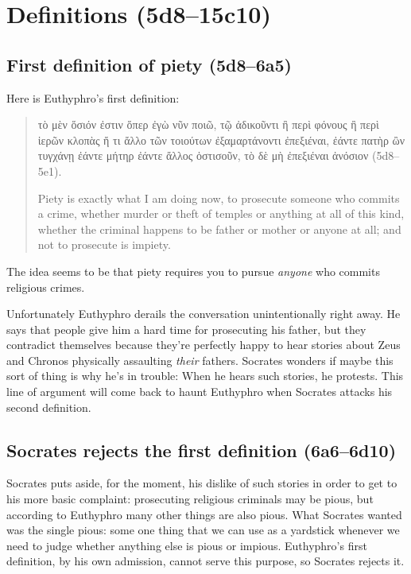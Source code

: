 \documentclass[11pt]{article}
\begin{document}

\section{Definitions (5d8--15c10)}

\subsection{First definition of piety (5d8--6a5)}

Here is Euthyphro's first definition:

\begin{quote}

    {\g
    τὸ μὲν ὅσιόν ἐστιν ὅπερ ἐγὼ νῦν ποιῶ, τῷ ἀδικοῦντι ἢ περὶ φόνους ἢ περὶ
    ἱερῶν κλοπὰς ἤ τι ἄλλο τῶν τοιούτων ἐξαμαρτάνοντι ἐπεξιέναι, ἐάντε
    πατὴρ ὢν τυγχάνῃ ἐάντε μήτηρ ἐάντε ἄλλος ὁστισοῦν, τὸ δὲ μὴ ἐπεξιέναι
    ἀνόσιον
    } (5d8--5e1).

    Piety is exactly what I am doing now, to prosecute someone who commits
    a crime, whether murder or theft of temples or anything at all of this
    kind, whether the criminal happens to be father or mother or anyone at
    all; and not to prosecute is impiety.

\end{quote}

The idea seems to be that piety requires you to pursue \emph{anyone} who
commits religious crimes.

Unfortunately Euthyphro derails the conversation unintentionally right
away.  He says that people give him a hard time for prosecuting his father,
but they contradict themselves because they're perfectly happy to hear
stories about Zeus and Chronos physically assaulting \emph{their} fathers.
Socrates wonders if maybe this sort of thing is why he's in trouble: When
he hears such stories, he protests.  This line of argument will come back
to haunt Euthyphro when Socrates attacks his second definition.


\subsection{Socrates rejects the first definition (6a6--6d10)}

Socrates puts aside, for the moment, his dislike of such stories in order
to get to his more basic complaint: prosecuting religious criminals may be
pious, but according to Euthyphro many other things are also pious.  What
Socrates wanted was the single pious: some one thing that we can use as
a yardstick whenever we need to judge whether anything else is pious or
impious.  Euthyphro's first definition, by his own admission, cannot serve
this purpose, so Socrates rejects it.
\end{document}
